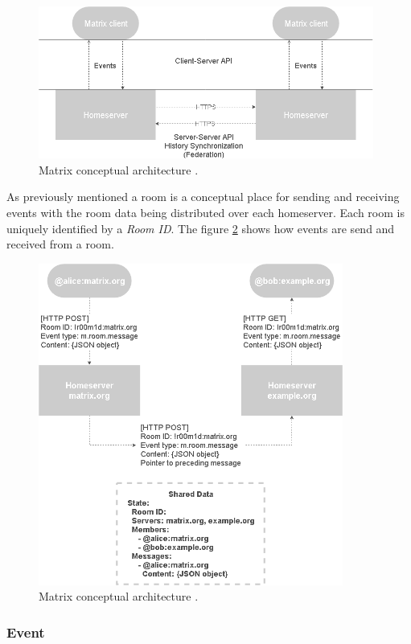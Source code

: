 \begin{figure}[H]
	\centering
	\includegraphics[width=11cm]{figures/matrix_architecture.png}
	\caption{ Matrix conceptual architecture \cite{matrixspec}.}
	\label{fig:matrix_architecture}
\end{figure}


As previously mentioned a room is a conceptual place for sending and receiving events with the room data being distributed over each homeserver. Each room is uniquely identified by a \emph{Room ID}. The figure \ref{fig:matrix_room} shows how events are send and received from a room.



\begin{figure}[H]
	\centering
	\includegraphics[width=10cm]{figures/matrix_room.png}
	\caption{ Matrix conceptual architecture \cite{matrixspec}.}
	\label{fig:matrix_room}
\end{figure}

\subsubsection{Event}

